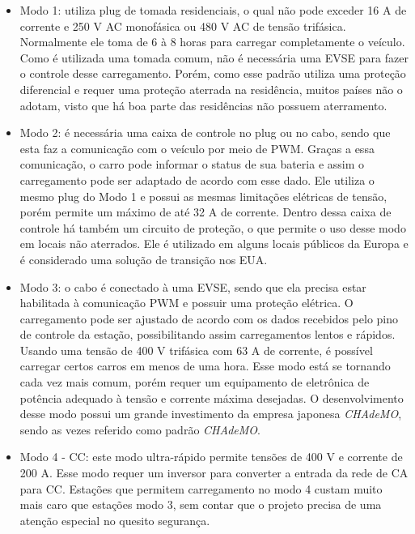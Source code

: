 \begin{itemize}
  \item Modo 1: utiliza plug de tomada residenciais, o qual não pode exceder 16 A de corrente e 250 V \ac{AC} monofásica ou 480 V AC de tensão trifásica. Normalmente ele toma de 6 à 8 horas para carregar completamente o veículo. Como é utilizada uma tomada comum, não é necessária uma \ac{EVSE} para fazer o controle desse carregamento. Porém, como esse padrão utiliza uma proteção diferencial e requer uma proteção aterrada na residência, muitos países não o adotam, visto que há boa parte das residências não possuem aterramento.

  \item Modo 2: é necessária uma caixa de controle no plug ou no cabo, sendo que esta faz a comunicação com o veículo por meio de \ac{PWM}. Graças a essa comunicação, o carro pode informar o status de sua bateria e assim o carregamento pode ser adaptado de acordo com esse dado. Ele utiliza o mesmo plug do Modo 1 e possui as mesmas limitações elétricas de tensão, porém permite um máximo de até 32 A de corrente. Dentro dessa caixa de controle há também um circuito de proteção, o que permite o uso desse modo em locais não aterrados. Ele é utilizado em alguns locais públicos da Europa e é considerado uma solução de transição nos EUA.

  \item Modo 3: o cabo é conectado à uma \ac{EVSE}, sendo que ela precisa estar habilitada à comunicação PWM e possuir uma proteção elétrica. O carregamento pode ser ajustado de acordo com os dados recebidos pelo pino de controle da estação, possibilitando assim carregamentos lentos e rápidos. Usando uma tensão de 400 V trifásica com 63 A de corrente, é possível carregar certos carros em menos de uma hora. Esse modo está se tornando cada vez mais comum, porém requer um equipamento de eletrônica de potência adequado à tensão e corrente máxima desejadas. O desenvolvimento desse modo possui um grande investimento da empresa japonesa \textit{CHAdeMO}, sendo as vezes referido como padrão \textit{CHAdeMO}.

  \item Modo 4 - \ac{CC}: este modo ultra-rápido permite tensões de 400 V e corrente de 200 A. Esse modo requer um inversor para converter a entrada da rede de CA para CC. Estações que permitem carregamento no modo 4 custam muito mais caro que estações modo 3, sem contar que o projeto precisa de uma atenção especial no quesito segurança.
\end{itemize}

